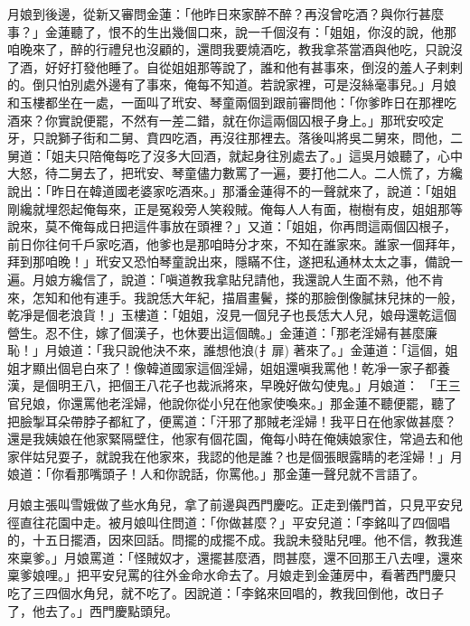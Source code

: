 月娘到後邊，從新又審問金蓮：「他昨日來家醉不醉？再沒曾吃酒？與你行甚麼事？」金蓮聽了，恨不的生出幾個口來，說一千個沒有：「姐姐，你沒的說，他那咱晚來了，醉的行禮兒也沒顧的，還問我要燒酒吃，教我拿茶當酒與他吃，只說沒了酒，好好打發他睡了。自從姐姐那等說了，誰和他有甚事來，倒沒的羞人子剌剌的。倒只怕別處外邊有了事來，俺每不知道。若說家裡，可是沒絲毫事兒。」月娘和玉樓都坐在一處，一面叫了玳安、琴童兩個到跟前審問他：「你爹昨日在那裡吃酒來？你實說便罷，不然有一差二錯，就在你這兩個囚根子身上。」那玳安咬定牙，只說獅子街和二舅、賁四吃酒，再沒往那裡去。落後叫將吳二舅來，問他，二舅道：「姐夫只陪俺每吃了沒多大回酒，就起身往別處去了。」這吳月娘聽了，心中大怒，待二舅去了，把玳安、琴童儘力數罵了一遍，要打他二人。二人慌了，方纔說出：「昨日在韓道國老婆家吃酒來。」那潘金蓮得不的一聲就來了，說道：「姐姐剛纔就埋怨起俺每來，正是冤殺旁人笑殺賊。俺每人人有面，樹樹有皮，姐姐那等說來，莫不俺每成日把這件事放在頭裡？」又道：「姐姐，你再問這兩個囚根子，前日你往何千戶家吃酒，他爹也是那咱時分才來，不知在誰家來。誰家一個拜年，拜到那咱晚！」玳安又恐怕琴童說出來，隱瞞不住，遂把私通林太太之事，備說一遍。月娘方纔信了，說道：「嗔道教我拿貼兒請他，我還說人生面不熟，他不肯來，怎知和他有連手。我說恁大年紀，描眉畫鬢，搽的那臉倒像膩抹兒抹的一般，乾凈是個老浪貨！」玉樓道：「姐姐，沒見一個兒子也長恁大人兒，娘母還乾這個營生。忍不住，嫁了個漢子，也休要出這個醜。」金蓮道：「那老淫婦有甚麼廉恥！」月娘道：「我只說他決不來，誰想他浪(扌扉) 著來了。」金蓮道：「這個，姐姐才顯出個皂白來了！像韓道國家這個淫婦，姐姐還嗔我罵他！乾凈一家子都養漢，是個明王八，把個王八花子也裁派將來，早晚好做勾使鬼。」月娘道： 「王三官兒娘，你還罵他老淫婦，他說你從小兒在他家使喚來。」那金蓮不聽便罷，聽了把臉掣耳朵帶脖子都紅了，便罵道：「汗邪了那賊老淫婦！我平日在他家做甚麼？還是我姨娘在他家緊隔壁住，他家有個花園，俺每小時在俺姨娘家住，常過去和他家伴姑兒耍子，就說我在他家來，我認的他是誰？也是個張眼露睛的老淫婦！」月娘道：「你看那嘴頭子！人和你說話，你罵他。」那金蓮一聲兒就不言語了。

月娘主張叫雪娥做了些水角兒，拿了前邊與西門慶吃。正走到儀門首，只見平安兒徑直往花園中走。被月娘叫住問道：「你做甚麼？」平安兒道：「李銘叫了四個唱的，十五日擺酒，因來回話。問擺的成擺不成。我說未發貼兒哩。他不信，教我進來稟爹。」月娘罵道：「怪賊奴才，還擺甚麼酒，問甚麼，還不回那王八去哩，還來稟爹娘哩。」把平安兒罵的往外金命水命去了。月娘走到金蓮房中，看著西門慶只吃了三四個水角兒，就不吃了。因說道：「李銘來回唱的，教我回倒他，改日子了，他去了。」西門慶點頭兒。

